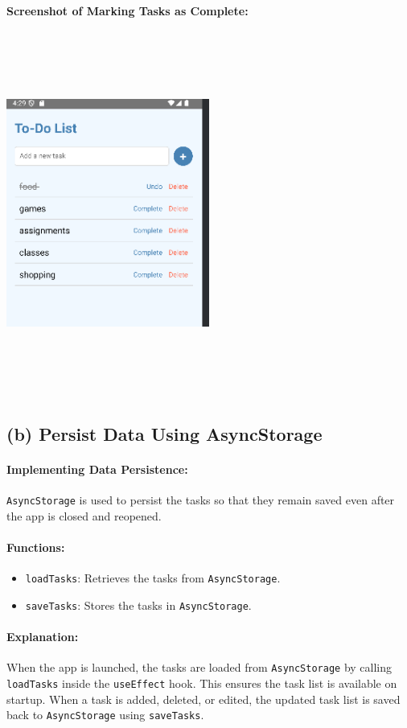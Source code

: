 \documentclass[12pt]{article}
\begin{document}
\textbf{Screenshot of Marking Tasks as Complete:}
\begin{center}
    \includegraphics[width=0.5\textwidth, height=12cm]{images/completedtask3.png} 
\end{center}

\subsection*{(b) Persist Data Using AsyncStorage}

\paragraph{Implementing Data Persistence:}
\texttt{AsyncStorage} is used to persist the tasks so that they remain saved even after the app is closed and reopened.

\paragraph{Functions:}
\begin{itemize}
    \item \texttt{loadTasks}: Retrieves the tasks from \texttt{AsyncStorage}.
    \item \texttt{saveTasks}: Stores the tasks in \texttt{AsyncStorage}.
\end{itemize}

\paragraph{Explanation:}
When the app is launched, the tasks are loaded from \texttt{AsyncStorage} by calling \texttt{loadTasks} inside the \texttt{useEffect} hook. This ensures the task list is available on startup. When a task is added, deleted, or edited, the updated task list is saved back to \texttt{AsyncStorage} using \texttt{saveTasks}.
\end{document}
